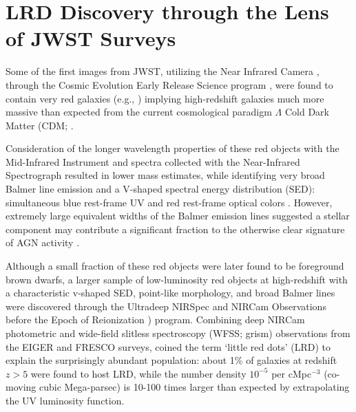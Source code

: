 \documentclass[utf8]{FrontiersinHarvard} %
\begin{document}
\section{LRD Discovery through the Lens of JWST Surveys}
\label{sec:obs}
Some of the first images from JWST, utilizing the Near Infrared Camera \citep[NIRCam;][]{rieke2023performance}, through the Cosmic Evolution Early Release Science program \citep[CEERS;][]{finkelstein2023ceers}, were found to contain very red galaxies (e.g., \citealt{endsley2023jwst,labbe2023population,onoue2023candidate}) implying high-redshift galaxies much more massive than expected from the current cosmological paradigm $\Lambda$ Cold Dark Matter (CDM; \citealt{boylan2023stress,ferrara2023stunning,lovell2023extreme}. 

Consideration of the longer wavelength properties of these red objects with the Mid-Infrared Instrument \citep[MIRI;][]{argyriou2023jwst} and spectra collected with the Near-Infrared Spectrograph \citep[NIRSpec;][]{bagnasco2007overview} resulted in lower mass estimates, while identifying very broad Balmer line emission and a V-shaped spectral energy distribution (SED): simultaneous blue rest-frame UV and red rest-frame optical colors \citep{carnall2023massive,kocevski2023hidden,barro2024extremely}. 
However, extremely large equivalent widths of the Balmer emission lines suggested a stellar component may contribute a significant fraction to the otherwise clear signature of AGN activity \citep{carnall2023massive}.

Although a small fraction of these red objects were later found to be foreground brown dwarfs, a larger sample of low-luminosity red objects at high-redshift with a characteristic v-shaped SED, point-like morphology, and broad Balmer lines \citep{furtak2023jwst,greene2024uncover,labbe2024uncover} were discovered through the Ultradeep NIRSpec and NIRCam Observations before the Epoch of Reionization \citep[UNCOVER;][]{bezanson2024jwst}) program. 
Combining deep NIRCam photometric and wide-field slitless spectroscopy (WFSS; grism) observations from the EIGER \citep{kashino2023eiger} and FRESCO \citep{oesch2023jwst} surveys, \citet{matthee2024little} coined the term `little red dots' (LRD) to explain the surprisingly abundant population: 
about 1\% of galaxies at redshift $z > 5$ were found to host LRD, while the number density $10^{-5}$ per cMpc$^{-3}$ (co-moving cubic Mega-parsec) is 10-100 times larger than expected by extrapolating the UV luminosity function.
\end{document}
